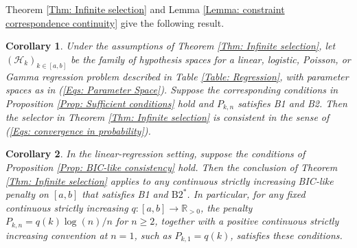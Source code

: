 \documentclass[12pt]{article}
\newtheorem{corollary}{Corollary}
\theoremstyle{remark}
\theoremstyle{plain}
\begin{document}
Theorem \ref{Thm: Infinite selection} and Lemma \ref{Lemma: constraint correspondence continuity} give the following result.

\begin{corollary}\label{Cor: continuum PanIC GLM}
Under the assumptions of Theorem \ref{Thm: Infinite selection}, let $(\mathcal H_k)_{k\in[a,b]}$ be the family of hypothesis spaces for a linear, logistic, Poisson, or Gamma regression problem described in Table \ref{Table: Regression}, with parameter spaces as in (\ref{Eqs: Parameter Space}). Suppose the corresponding conditions in Proposition \ref{Prop: Sufficient conditions} hold and $P_{k,n}$ satisfies B1 and B2. Then the selector in Theorem \ref{Thm: Infinite selection} is consistent in the sense of (\ref{Eqs: convergence in probability}).
\end{corollary}

\begin{corollary}\label{Cor: continuum BIC linear}
In the linear-regression setting, suppose the conditions of Proposition \ref{Prop: BIC-like consistency} hold. Then the conclusion of Theorem \ref{Thm: Infinite selection} applies to any continuous strictly increasing BIC-like penalty on $[a,b]$ that satisfies B1 and $\mathrm{B2}^*$. In particular, for any fixed continuous strictly increasing $q:[a,b]\to\mathbb R_{>0}$, the penalty $P_{k,n}=q(k)\log(n)/n$ for $n\ge2$, together with a positive continuous strictly increasing convention at $n=1$, such as $P_{k,1}=q(k)$, satisfies these conditions.
\end{corollary}
\end{document}
